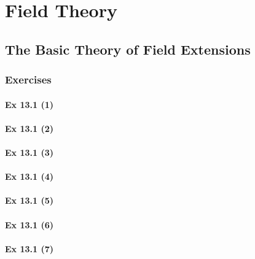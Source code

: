 \setcounter{chapter}{0}
\renewcommand{\thechapter}{13}
\chapter{Field Theory}\label{ch:13}
\setcounter{equation}{0}	        %

\section{The  Basic Theory of Field Extensions}\label{sec:13.1}	
\subsection*{Exercises}\label{sec:13.1_Exercises}

\subsubsection{Ex 13.1 (1)}\label{sec:Ex_13.1.1}

\subsubsection{Ex 13.1 (2)}\label{sec:Ex_13.1.2}

\subsubsection{Ex 13.1 (3)}\label{sec:Ex_13.1.3}

\subsubsection{Ex 13.1 (4)}\label{sec:Ex_13.1.4}

\subsubsection{Ex 13.1 (5)}\label{sec:Ex_13.1.5}

\subsubsection{Ex 13.1 (6)}\label{sec:Ex_13.1.6}

\subsubsection{Ex 13.1 (7)}\label{sec:Ex_13.1.7}

